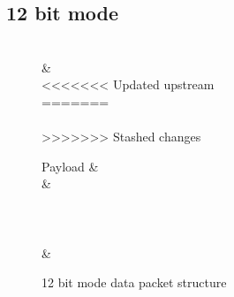 \documentclass[]{article}
\begin{document}
\subsection{12 bit mode}
\label{12bit}
\begin{figure}[H]
	\centering
	\begin{bytefield}[bitwidth=2em]{16}
		 \\
		 &  \\
<<<<<<< Updated upstream
		  \\
=======
		 \\
		 \\
>>>>>>> Stashed changes
		\begin{rightwordgroup}{Payload}
			 &  \\
			 &  \\
			 \\
			 \\
			 \\
			 &  \\
		\end{rightwordgroup}
	\end{bytefield}
	\caption{12 bit mode data packet structure}
\end{figure}
\end{document}
